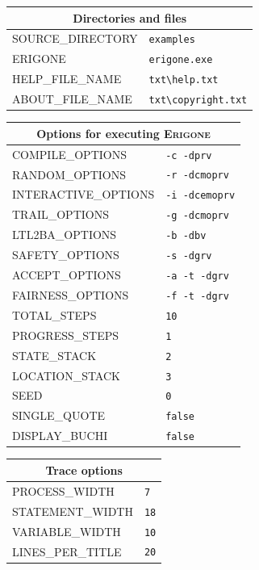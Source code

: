 \documentclass[11pt]{article}
\newcommand{\eri}{\textsc{Erigone}}
\begin{document}
\begin{center}

\begin{tabular}{|p{}|p{}|}
\hline
\multicolumn{2}{|c|}{Directories and files}\\ \hline
\textsc{\ttfamily SOURCE\_DIRECTORY} & \verb+examples+ \\
\textsc{\ttfamily ERIGONE} &\verb+erigone.exe+ \\
\textsc{\ttfamily HELP\_FILE\_NAME} &\verb+txt\help.txt+\\
\textsc{\ttfamily ABOUT\_FILE\_NAME} &\verb+txt\copyright.txt+\\
\hline
\end{tabular}

\bigskip

\begin{tabular}{|p{}|p{}|}
\hline
\multicolumn{2}{|c|}{Options for executing \eri{}}\\ \hline
\textsc{\ttfamily COMPILE\_OPTIONS} &\verb+-c -dprv+\\
\textsc{\ttfamily RANDOM\_OPTIONS} &\verb+-r -dcmoprv+\\
\textsc{\ttfamily INTERACTIVE\_OPTIONS} &\verb+-i -dcemoprv+\\
\textsc{\ttfamily TRAIL\_OPTIONS} &\verb+-g -dcmoprv+\\
\textsc{\ttfamily LTL2BA\_OPTIONS} &\verb+-b -dbv+\\
\textsc{\ttfamily SAFETY\_OPTIONS} &\verb+-s -dgrv+\\
\textsc{\ttfamily ACCEPT\_OPTIONS} &\verb+-a -t -dgrv+\\
\textsc{\ttfamily FAIRNESS\_OPTIONS} &\verb+-f -t -dgrv+\\
\hline\hline
\textsc{\ttfamily TOTAL\_STEPS} & \verb+10+\\
\textsc{\ttfamily PROGRESS\_STEPS} & \verb+1+\\
\textsc{\ttfamily STATE\_STACK} & \verb+2+\\
\textsc{\ttfamily LOCATION\_STACK} & \verb+3+\\
\textsc{\ttfamily SEED} & \verb+0+\\
\textsc{\ttfamily SINGLE\_QUOTE} & \verb+false+\\
\textsc{\ttfamily DISPLAY\_BUCHI} & \verb+false+\\\hline
\end{tabular}

\bigskip

\begin{tabular}{|p{}|p{}|}
\hline
\multicolumn{2}{|c|}{Trace options}\\ \hline
\textsc{\ttfamily PROCESS\_WIDTH} & \verb+7+\\
\textsc{\ttfamily STATEMENT\_WIDTH} & \verb+18+\\
\textsc{\ttfamily VARIABLE\_WIDTH} &\verb+10+\\
\textsc{\ttfamily LINES\_PER\_TITLE} &\verb+20+\\
\hline
\end{tabular}


\end{center}
\end{document}
